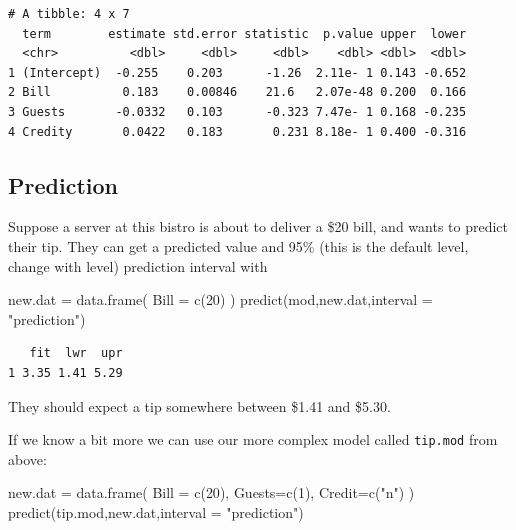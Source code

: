 \documentclass[
  letterpaper,
  DIV=11,
  numbers=noendperiod]{scrreprt}
\newenvironment{Shaded}{}{}
\newcommand{\AttributeTok}[1]{\textcolor[rgb]{0.49,0.56,0.16}{#1}}
\newcommand{\DecValTok}[1]{\textcolor[rgb]{0.25,0.63,0.44}{#1}}
\newcommand{\FunctionTok}[1]{\textcolor[rgb]{0.02,0.16,0.49}{#1}}
\newcommand{\NormalTok}[1]{#1}
\newcommand{\OtherTok}[1]{\textcolor[rgb]{0.00,0.44,0.13}{#1}}
\newcommand{\StringTok}[1]{\textcolor[rgb]{0.25,0.44,0.63}{#1}}
\begin{document}
\begin{verbatim}
# A tibble: 4 x 7
  term        estimate std.error statistic  p.value upper  lower
  <chr>          <dbl>     <dbl>     <dbl>    <dbl> <dbl>  <dbl>
1 (Intercept)  -0.255    0.203      -1.26  2.11e- 1 0.143 -0.652
2 Bill          0.183    0.00846    21.6   2.07e-48 0.200  0.166
3 Guests       -0.0332   0.103      -0.323 7.47e- 1 0.168 -0.235
4 Credity       0.0422   0.183       0.231 8.18e- 1 0.400 -0.316
\end{verbatim}

\subsection{Prediction}\label{prediction}

Suppose a server at this bistro is about to deliver a \$20 bill, and
wants to predict their tip. They can get a predicted value and 95\%
(this is the default level, change with level) prediction interval with

\begin{Shaded}
\begin{Highlighting}[]
\NormalTok{new.dat }\OtherTok{=} \FunctionTok{data.frame}\NormalTok{( }\AttributeTok{Bill =} \FunctionTok{c}\NormalTok{(}\DecValTok{20}\NormalTok{) )}
\FunctionTok{predict}\NormalTok{(mod,new.dat,}\AttributeTok{interval =} \StringTok{"prediction"}\NormalTok{)}
\end{Highlighting}
\end{Shaded}

\begin{verbatim}
   fit  lwr  upr
1 3.35 1.41 5.29
\end{verbatim}

They should expect a tip somewhere between \$1.41 and \$5.30.

If we know a bit more we can use our more complex model called
\texttt{tip.mod} from above:

\begin{Shaded}
\begin{Highlighting}[]
\NormalTok{new.dat }\OtherTok{=} \FunctionTok{data.frame}\NormalTok{( }\AttributeTok{Bill =} \FunctionTok{c}\NormalTok{(}\DecValTok{20}\NormalTok{), }\AttributeTok{Guests=}\FunctionTok{c}\NormalTok{(}\DecValTok{1}\NormalTok{), }\AttributeTok{Credit=}\FunctionTok{c}\NormalTok{(}\StringTok{"n"}\NormalTok{) )}
\FunctionTok{predict}\NormalTok{(tip.mod,new.dat,}\AttributeTok{interval =} \StringTok{"prediction"}\NormalTok{)}
\end{Highlighting}
\end{Shaded}
\end{document}
